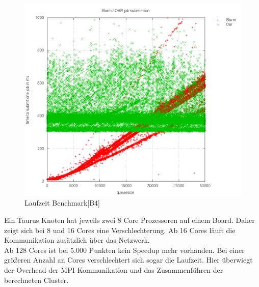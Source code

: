 	\begin{figure}[H]
		\centering
		\includegraphics[scale=0.8]{../oar/output/pics/oar_slurm.png} 
		\caption{Laufzeit Benchmark[B4]}
	\end{figure}
    \newpage 


	Ein Taurus Knoten hat jeweils zwei 8 Core Prozessoren auf einem Board. Daher zeigt sich bei 8 und 16 Cores eine Verschlechterung. 
	Ab 16 Cores läuft die Kommunikation zusätzlich über das Netzwerk.\\
	Ab 128 Cores ist bei 5.000 Punkten kein Speedup mehr vorhanden. Bei einer größeren Anzahl an Cores verschlechtert sich sogar die Laufzeit. Hier
	überwiegt der Overhead der MPI Kommunikation und das Zusammenführen der berechneten Cluster.\\
	\newpage
